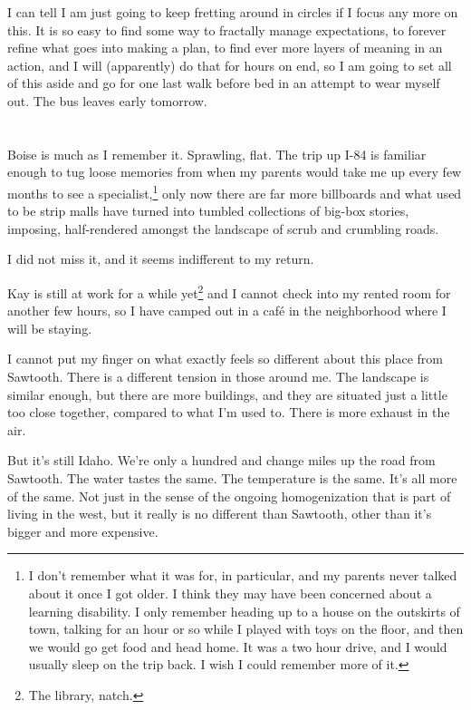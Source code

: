 I can tell I am just going to keep fretting around in circles if I focus any more on this. It is so easy to find some way to fractally manage expectations, to forever refine what goes into making a plan, to find ever more layers of meaning in an action, and I will (apparently) do that for hours on end, so I am going to set all of this aside and go for one last walk before bed in an attempt to wear myself out. The bus leaves early tomorrow.

\section{}

Boise is much as I remember it. Sprawling, flat. The trip up I-84 is familiar enough to tug loose memories from when my parents would take me up every few months to see a specialist,\footnote{I don't remember what it was for, in particular, and my parents never talked about it once I got older. I think they may have been concerned about a learning disability. I only remember heading up to a house on the outskirts of town, talking for an hour or so while I played with toys on the floor, and then we would go get food and head home. It was a two hour drive, and I would usually sleep on the trip back. I wish I could remember more of it.} only now there are far more billboards and what used to be strip malls have turned into tumbled collections of big-box stories, imposing, half-rendered amongst the landscape of scrub and crumbling roads.

I did not miss it, and it seems indifferent to my return.

Kay is still at work for a while yet\footnote{The library, natch.} and I cannot check into my rented room for another few hours, so I have camped out in a café in the neighborhood where I will be staying.

I cannot put my finger on what exactly feels so different about this place from Sawtooth. There is a different tension in those around me. The landscape is similar enough, but there are more buildings, and they are situated just a little too close together, compared to what I'm used to. There is more exhaust in the air.

But it's still Idaho. We're only a hundred and change miles up the road from Sawtooth. The water tastes the same. The temperature is the same. It's all more of the same. Not just in the sense of the ongoing homogenization that is part of living in the west, but it really is no different than Sawtooth, other than it's bigger and more expensive.

